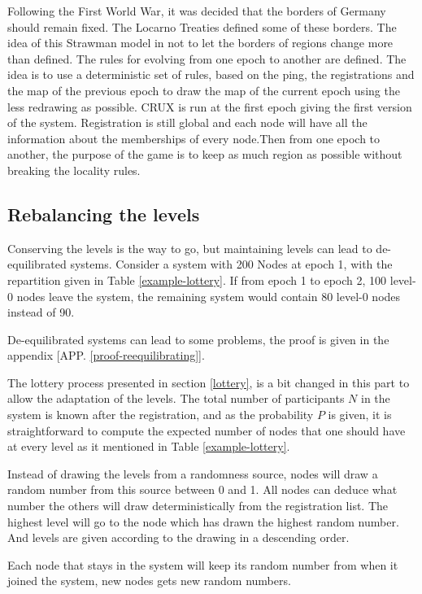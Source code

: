 \documentclass[a4paper,11pt,oneside]{report}
\begin{document}
Following the First World War, it was decided that the borders of Germany
should remain fixed. The Locarno Treaties defined some of these borders. The
idea of this Strawman model in not to let the borders of regions change more
than defined. The rules for evolving from one epoch to another are defined. The
idea is to use a deterministic set of rules, based on the ping, the
registrations and the map of the previous epoch to draw the map of the current
epoch using the less redrawing as possible. CRUX is run at the first epoch
giving the first version of the system. Registration is still global and each
node will have all the information about the memberships of every node.Then
from one epoch to another, the purpose of the game is to keep as much region as
possible without breaking the locality rules.

\subsection{Rebalancing the levels} \label{rebalancing}
Conserving the levels is the way to go, but maintaining levels can lead to
de-equilibrated systems. Consider a system with 200 Nodes at epoch 1, with the
repartition given in Table \ref{example-lottery}. If from epoch 1 to epoch 2,
100 level-0 nodes leave the system, the remaining system would contain 80
level-0 nodes instead of 90. 

De-equilibrated systems can lead to some problems, the proof is given in the
appendix [APP. \ref{proof-reequilibrating}].

The lottery process presented in section \ref{lottery}, is a bit changed in
this part to allow the adaptation of the levels. The total number of
participants $N$ in the system is known after the registration, and as the
probability $P$ is given, it is straightforward to compute the expected number
of nodes that one should have at every level as it mentioned in Table
\ref{example-lottery}. 

Instead of drawing the levels from a randomness source, nodes will draw a
random number from this source between 0 and 1.  All nodes can deduce what
number the others will draw deterministically from the registration list. The
highest level will go to the node which has drawn the highest random number.
And levels are given according to the drawing in a descending order.  

Each node that stays in the system will keep its random number from when it
joined the system, new nodes gets new random numbers. 
\end{document}
